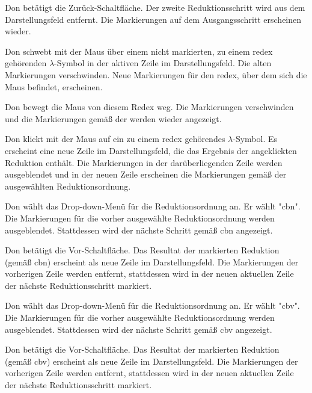 \documentclass[parskip=full,11pt,twoside]{scrartcl}
\begin{document}
{Don betätigt die Zurück-Schaltfläche.}
{Der zweite Reduktionsschritt wird aus dem Darstellungsfeld entfernt. Die Markierungen
auf dem Ausgangsschritt erscheinen wieder.}

{Don schwebt mit der Maus über einem nicht markierten, zu einem \gls{redex} gehörenden
$\lambda$-Symbol in der aktiven Zeile im Darstellungsfeld.}
{Die alten Markierungen verschwinden. Neue Markierungen für den \gls{redex}, über dem
sich die Maus befindet, erscheinen.}

{Don bewegt die Maus von diesem Redex weg.}
{Die Markierungen verschwinden und die Markierungen gemäß der 
werden wieder angezeigt.}

{Don klickt mit der Maus auf ein zu einem \gls{redex} gehörendes $\lambda$-Symbol.}
{Es erscheint eine neue Zeile im Darstellungsfeld, die das Ergebnis der angeklickten
Reduktion enthält. Die Markierungen in der darüberliegenden Zeile werden ausgeblendet
und in der neuen Zeile erscheinen die Markierungen gemäß der ausgewählten
Reduktionsordnung.}

{Don wählt das Drop-down-Menü für die Reduktionsordnung an. Er wählt "\gls{cbn}".}
{Die Markierungen für die vorher ausgewählte Reduktionsordnung werden ausgeblendet.
Stattdessen wird der nächste Schritt gemäß \gls{cbn} angezeigt.}

{Don betätigt die Vor-Schaltfläche.}
{Das Resultat der markierten Reduktion (gemäß \gls{cbn}) erscheint als neue Zeile im Darstellungsfeld.
Die Markierungen der vorherigen Zeile werden entfernt, stattdessen wird in der neuen
aktuellen Zeile der nächste Reduktionsschritt markiert.}

{Don wählt das Drop-down-Menü für die Reduktionsordnung an. Er wählt "\gls{cbv}".}
{Die Markierungen für die vorher ausgewählte Reduktionsordnung werden ausgeblendet.
Stattdessen wird der nächste Schritt gemäß \gls{cbv} angezeigt.}

{Don betätigt die Vor-Schaltfläche.}
{Das Resultat der markierten Reduktion (gemäß \gls{cbv}) erscheint als neue Zeile im Darstellungsfeld.
Die Markierungen der vorherigen Zeile werden entfernt, stattdessen wird in der neuen
aktuellen Zeile der nächste Reduktionsschritt markiert.}
\end{document}
